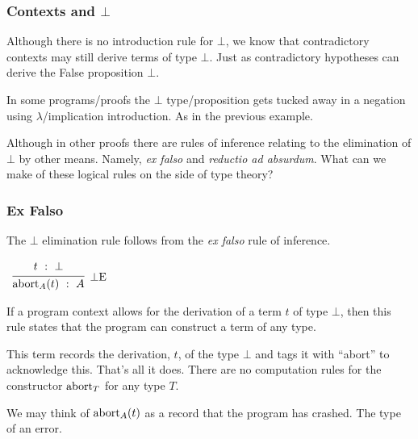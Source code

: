 \documentclass{beamer}
\theoremstyle{indentDefn} \newtheorem{defn}[]{Definition}
\begin{document}
\begin{frame}
  \frametitle{Contexts and $\bot$}

  Although there is no introduction rule for $\bot$, we know that contradictory contexts may still derive terms of type $\bot$. Just as contradictory hypotheses can derive the False proposition $\bot$. 

  \vspace{0.5cm}

  In some programs/proofs the $\bot$ type/proposition gets tucked away in a negation using $\lambda$/implication introduction. As in the previous example. 

  \vspace{0.5cm}

  Although in other proofs there are rules of inference relating to the elimination of $\bot$ by other means. Namely, \emph{ex falso} and \emph{reductio ad absurdum}. What can we make of these logical rules on the side of type theory?
\end{frame}

\begin{frame}
  \frametitle{Ex Falso}

  The $\bot$ elimination rule follows from the \emph{ex falso} rule of inference.
  
  \vspace{0.5cm}

  \begin{center}		
		$\begin{array}{c}		
		\infer[\bot \text{E}]{\abort_{A}(t) \ : \ A}
		{\begin{array}{c} t \ : \ \bot \end{array}}
		\end{array}$
	\end{center}

  If a program context allows for the derivation of a term $t$ of type $\bot$, then this rule states that the program can construct a term of any type.

  \vspace{0.5cm}

  This term records the derivation, $t$, of the type $\bot$ and tags it with ``abort'' to acknowledge this. That's all it does. There are no computation rules for the constructor $\text{abort}_{T}$ for any type $T$. 

  \vspace{0.5cm}

  We may think of $\text{abort}_{A}(t)$ as a record that the program has crashed. The type of an error. 

\end{frame}
\end{document}
